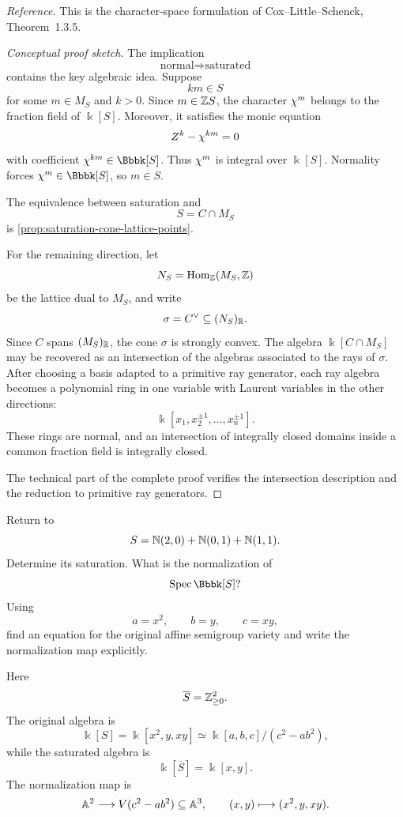 \noindent
\textit{Reference.}
This is the character-space formulation of
Cox--Little--Schenck, Theorem~1.3.5.

\begin{proof}[Conceptual proof sketch]
The implication
\[
\text{normal}\Longrightarrow\text{saturated}
\]
contains the key algebraic idea. Suppose
\[
km\in S
\]
for some \(m\in M_S\) and \(k>0\). Since \(m\in\mathbb{Z} S\), the character
\(\chi^{m}\) belongs to the fraction field of \(\Bbbk[S]\).
Moreover, it satisfies the monic equation
\[
Z^k-\chi^{km}=0
\]
with coefficient \(\character{km}\in\Bbbk[S]\). Thus
\(\chi^{m}\) is integral over \(\Bbbk[S]\). Normality forces
\(\character{m}\in\Bbbk[S]\), so \(m\in S\).

The equivalence between saturation and
\[
S=C\cap M_S
\]
is \cref{prop:saturation-cone-lattice-points}.

For the remaining direction, let
\[
N_S=\operatorname{Hom}_{\mathbb{Z}}(M_S,\mathbb{Z})
\]
be the lattice dual to \(M_S\), and write
\[
\sigma=C^\vee\subseteq (N_S)_{\mathbb{R}}.
\]
Since \(C\) spans \((M_S)_{\mathbb{R}}\), the cone \(\sigma\) is strongly
convex.
The algebra \(\Bbbk[C\cap M_S]\) may be recovered as an intersection of
the algebras associated to the rays of \(\sigma\). After choosing a
basis adapted to a primitive ray generator, each ray algebra becomes
a polynomial ring in one variable with Laurent variables in the other
directions:
\[
\Bbbk[x_1,x_2^{\pm1},\ldots,x_n^{\pm1}].
\]
These rings are normal, and an intersection of integrally closed
domains inside a common fraction field is integrally closed.

The technical part of the complete proof verifies the intersection
description and the reduction to primitive ray generators.
\end{proof}

\begin{pauseandthink}
Return to
\[
S=\mathbb{N}(2,0)+\mathbb{N}(0,1)+\mathbb{N}(1,1).
\]
Determine its saturation. What is the normalization of
\[
\Spec\Bbbk[S]?
\]
Using
\[
a=x^2,\qquad b=y,\qquad c=xy,
\]
find an equation for the original affine semigroup variety and write
the normalization map explicitly.
\end{pauseandthink}

Here
\[
\overline S=\mathbb{Z}_{\geq0}^2.
\]
The original algebra is
\[
\Bbbk[S]
=
\Bbbk[x^2,y,xy]
\simeq
\Bbbk[a,b,c]/(c^2-ab^2),
\]
while the saturated algebra is
\[
\Bbbk[\overline S]
=
\Bbbk[x,y].
\]
The normalization map is
\[
\mathbb{A}^2\longrightarrow V(c^2-ab^2)\subseteq\mathbb{A}^3,
\qquad
(x,y)\longmapsto(x^2,y,xy).
\]


